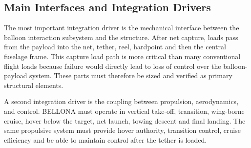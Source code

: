 





\subsection*{Main Interfaces and Integration Drivers}
\label{subsec:concept_a_interfaces}



The most important integration driver is the mechanical interface between the balloon interaction subsystem and the structure. After net capture, loads pass from the payload into the net, tether, reel, hardpoint and then the central fuselage frame. This capture load path is more critical than many conventional flight loads because failure would directly lead to loss of control over the balloon-payload system. These parts must therefore be sized and verified as primary structural elements.   

A second integration driver is the coupling between propulsion, aerodynamics, and control. BELLONA must operate in vertical take-off, transition, wing-borne cruise, hover below the target, net launch, towing descent and final landing. The same propulsive system must provide hover authority, transition control, cruise efficiency and be able to maintain control after the tether is loaded. %


